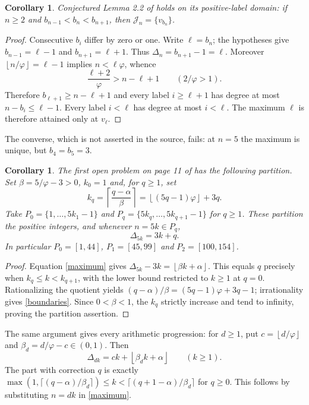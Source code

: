 \documentclass[11pt]{article}
\newtheorem{corollary}[theorem]{Corollary}
\newcommand{\fl}[1]{\left\lfloor #1\right\rfloor}
\newcommand{\J}{\mathcal J}
\newcommand{\ph}{\varphi}
\begin{document}
\begin{corollary}\label{nonrepeat}
Conjectured Lemma 2.2 of \cite[p.~4]{original} holds on its positive-label
domain: if $n\ge2$ and $b_{n-1}<b_n<b_{n+1}$, then
$\J_n=\{v_{b_n}\}$.
\end{corollary}
\begin{proof}
Consecutive $b_i$ differ by zero or one. Write $\ell=b_n$; the hypotheses
give $b_{n-1}=\ell-1$ and $b_{n+1}=\ell+1$. Thus
$\Delta_n=b_{n+1}-1=\ell$. Moreover $\fl{n/\ph}=\ell-1$ implies
$n<\ell\ph$, whence
\[
 \frac{\ell+2}{\ph}>n-\ell+1\qquad(2/\ph>1).
\]
Therefore $b_{\ell+1}\ge n-\ell+1$ and every label $i\ge\ell+1$
has degree at most $n-b_i\le\ell-1$. Every label $i<\ell$ has degree
at most $i<\ell$. The maximum $\ell$ is therefore attained only at $v_\ell$.
\end{proof}

The converse, which is not asserted in the source, fails: at $n=5$ the maximum
is unique, but $b_4=b_5=3$.

\begin{corollary}\label{partition}
The first open problem on page 11 of \cite{original} has the following
partition. Set $\beta=5/\ph-3>0$, $k_0=1$ and, for $q\ge1$, set
\begin{equation}\label{boundaries}
 k_q=\left\lceil\frac{q-\alpha}{\beta}\right\rceil
     =\fl{(5q-1)\ph}+3q.
\end{equation}
Take $P_0=\{1,\ldots,5k_1-1\}$ and
$P_q=\{5k_q,\ldots,5k_{q+1}-1\}$ for $q\ge1$. These partition the
positive integers, and whenever $n=5k\in P_q$,
\begin{equation}\label{five}
 \Delta_{5k}=3k+q.
\end{equation}
In particular $P_0=[1,44]$, $P_1=[45,99]$ and $P_2=[100,154]$.
\end{corollary}
\begin{proof}
Equation \eqref{maximum} gives
$\Delta_{5k}-3k=\fl{\beta k+\alpha}$.
This equals $q$ precisely when $k_q\le k<k_{q+1}$, with the lower
bound restricted to $k\ge1$ at $q=0$. Rationalizing the quotient yields
$(q-\alpha)/\beta=(5q-1)\ph+3q-1$; irrationality gives
\eqref{boundaries}. Since $0<\beta<1$, the $k_q$ strictly increase
and tend to infinity, proving the partition assertion.
\end{proof}

The same argument gives every arithmetic progression: for $d\ge1$,
put $c=\fl{d/\ph}$ and $\beta_d=d/\ph-c\in(0,1)$. Then
\[
 \Delta_{dk}=ck+\fl{\beta_d k+\alpha}\qquad(k\ge1).
\]
The part with correction $q$ is exactly
$\max(1,\lceil(q-\alpha)/\beta_d\rceil)\le k
<\lceil(q+1-\alpha)/\beta_d\rceil$ for $q\ge0$.
This follows by substituting $n=dk$ in \eqref{maximum}.
\end{document}
